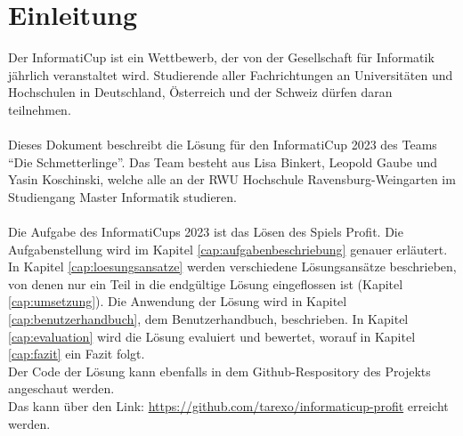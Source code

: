 \section{Einleitung}
\setcounter{page}{0}
Der InformatiCup ist ein Wettbewerb, der von der Gesellschaft für Informatik jährlich veranstaltet wird. Studierende aller Fachrichtungen an Universitäten und Hochschulen in Deutschland, Österreich und der Schweiz dürfen daran teilnehmen.
\\\\
Dieses Dokument beschreibt die Lösung für den InformatiCup 2023 des Teams “Die Schmetterlinge”. Das Team besteht aus Lisa Binkert, Leopold Gaube und Yasin Koschinski, welche alle an der RWU Hochschule Ravensburg-Weingarten im Studiengang Master Informatik studieren.
\\\\
Die Aufgabe des InformatiCups 2023 ist das Lösen des Spiels Profit. Die Aufgabenstellung wird im Kapitel \ref{cap:aufgabenbeschriebung}  genauer erläutert. In Kapitel \ref{cap:loesungsansatze} werden verschiedene Lösungsansätze beschrieben, von denen nur ein Teil in die endgültige Lösung eingeflossen ist (Kapitel \ref{cap:umsetzung}). Die Anwendung der Lösung wird in Kapitel \ref{cap:benutzerhandbuch}, dem Benutzerhandbuch, beschrieben. In Kapitel \ref{cap:evaluation} wird die Lösung evaluiert und bewertet, worauf in Kapitel \ref{cap:fazit} ein Fazit folgt.
\\
Der Code der Lösung kann ebenfalls in dem Github-Respository des Projekts angeschaut werden. \\
Das kann über den Link: \url{https://github.com/tarexo/informaticup-profit} erreicht werden.


